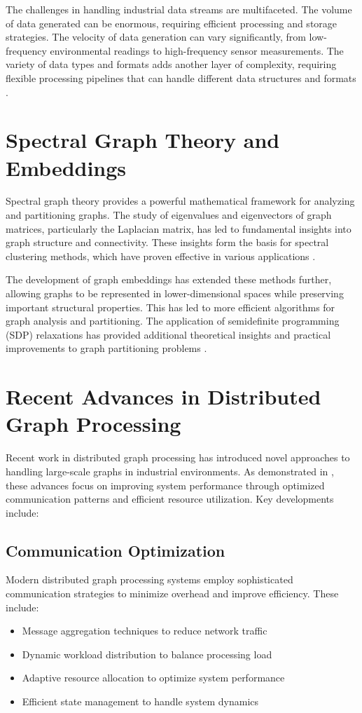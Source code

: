 The challenges in handling industrial data streams are multifaceted. The volume of data generated can be enormous, requiring efficient processing and storage strategies. The velocity of data generation can vary significantly, from low-frequency environmental readings to high-frequency sensor measurements. The variety of data types and formats adds another layer of complexity, requiring flexible processing pipelines that can handle different data structures and formats \cite{case2023}.

\section{Spectral Graph Theory and Embeddings}
Spectral graph theory provides a powerful mathematical framework for analyzing and partitioning graphs. The study of eigenvalues and eigenvectors of graph matrices, particularly the Laplacian matrix, has led to fundamental insights into graph structure and connectivity. These insights form the basis for spectral clustering methods, which have proven effective in various applications \cite{fiedler1973algebraic}.

The development of graph embeddings has extended these methods further, allowing graphs to be represented in lower-dimensional spaces while preserving important structural properties. This has led to more efficient algorithms for graph analysis and partitioning. The application of semidefinite programming (SDP) relaxations has provided additional theoretical insights and practical improvements to graph partitioning problems \cite{spectral2023}.

\section{Recent Advances in Distributed Graph Processing}
Recent work in distributed graph processing has introduced novel approaches to handling large-scale graphs in industrial environments. As demonstrated in \cite{paper63}, these advances focus on improving system performance through optimized communication patterns and efficient resource utilization. Key developments include:

\subsection{Communication Optimization}
Modern distributed graph processing systems employ sophisticated communication strategies to minimize overhead and improve efficiency. These include:
\begin{itemize}
    \item Message aggregation techniques to reduce network traffic
    \item Dynamic workload distribution to balance processing load
    \item Adaptive resource allocation to optimize system performance
    \item Efficient state management to handle system dynamics
\end{itemize}

